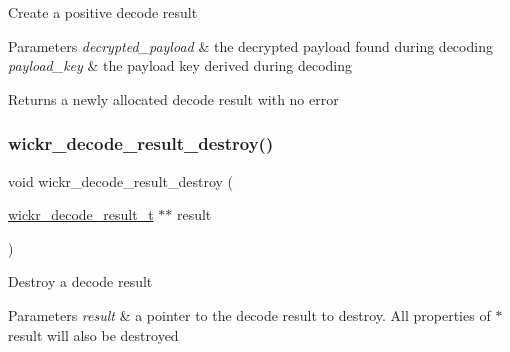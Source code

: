 Create a positive decode result


\begin{DoxyParams}{Parameters}
{\em decrypted\+\_\+payload} & the decrypted payload found during decoding \\
\hline
{\em payload\+\_\+key} & the payload key derived during decoding \\
\hline
\end{DoxyParams}
\begin{DoxyReturn}{Returns}
a newly allocated decode result with no error 
\end{DoxyReturn}
\mbox{\label{group__wickr__protocol_ga94154ab44a6c2e9b97a115e37416efe1}} 
\subsubsection{\texorpdfstring{wickr\+\_\+decode\+\_\+result\+\_\+destroy()}{wickr\_decode\_result\_destroy()}}
{\footnotesize\ttfamily void wickr\+\_\+decode\+\_\+result\+\_\+destroy (\begin{DoxyParamCaption}\item[{\mbox{\hyperlink{structwickr__decode__result}{wickr\+\_\+decode\+\_\+result\+\_\+t}} $\ast$$\ast$}]{result }\end{DoxyParamCaption})}

Destroy a decode result


\begin{DoxyParams}{Parameters}
{\em result} & a pointer to the decode result to destroy. All properties of \textquotesingle{}$\ast$result\textquotesingle{} will also be destroyed \\
\hline
\end{DoxyParams}
\mbox{\label{group__wickr__protocol_ga32d9da2e10d1d653b2ac894d50aaedb0}} 
